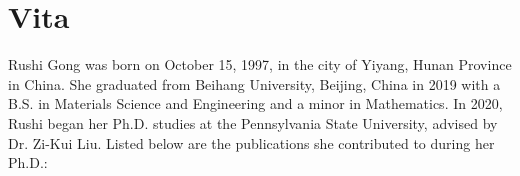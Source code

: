 \documentclass[letterpaper, 12pt]{report}
\newcommand{\mypart}[1]{\thispagestyle{empty}\part*{#1}}%
\begin{document}














%


\printbibliography[
heading=bibintoc,
title={Bibliography}
]


\newpage
\chapter*{Vita}
\thispagestyle{empty}
\vspace{-6pt}

{\small
Rushi Gong was born on October 15, 1997, in the city of Yiyang, Hunan Province in China. She graduated from Beihang University, Beijing, China in 2019 with a B.S. in Materials Science and Engineering and a minor in Mathematics. In 2020, Rushi began her Ph.D. studies at the Pennsylvania State University, advised by Dr. Zi-Kui Liu. Listed below are the publications she contributed to during her Ph.D.:
\fontsize{10}{10}\selectfont

}
\end{document}
